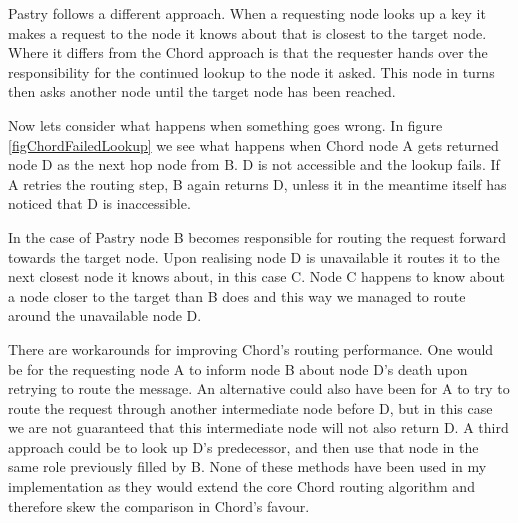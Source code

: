 Pastry follows a different approach. When a requesting node looks up a key it makes a request to the node it knows about that is closest to the target node. Where it differs from the Chord approach is that the requester hands over the responsibility for the continued lookup to the node it asked. This node in turns then asks another node until the target node has been reached.

Now lets consider what happens when something goes wrong.
In figure \ref{figChordFailedLookup} we see what happens when Chord node A gets returned node D as the next hop node from B. D is not accessible and the lookup fails. If A retries the routing step, B again returns D, unless it in the meantime itself has noticed that D is inaccessible.

In the case of Pastry node B becomes responsible for routing the request forward towards the target node. Upon realising node D is unavailable it routes it to the next closest node it knows about, in this case C. Node C happens to know about a node closer to the target than B does and this way we managed to route around the unavailable node D.

There are workarounds for improving Chord's routing performance. One would be for the requesting node A to inform node B about node D's death upon retrying to route the message. An alternative could also have been for A to try to route the request through another intermediate node before D, but in this case we are not guaranteed that this intermediate node will not also return D.
A third approach could be to look up D's predecessor, and then use that node in the same role previously filled by B. None of these methods have been used in my implementation as they would extend the core Chord routing algorithm and therefore skew the comparison in Chord's favour.

